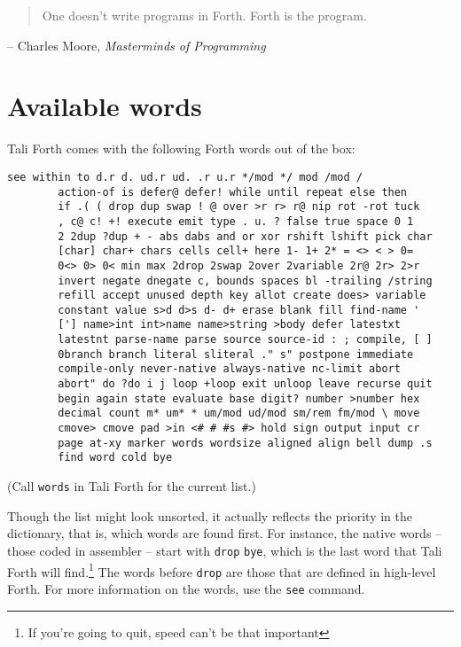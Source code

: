 
\begin{quote}
	One doesn't write programs in Forth. Forth is the program.
\end{quote}
\begin{flushright}
        -- Charles Moore, \textit{Masterminds of Programming}\cite{biancuzzi09}
\end{flushright}

\section{Available words}

Tali Forth comes with the following Forth words out of the
box:

\begin{lstlisting}[frame=lines]
        see within to d.r d. ud.r ud. .r u.r */mod */ mod /mod /
        action-of is defer@ defer! while until repeat else then
        if .( ( drop dup swap ! @ over >r r> r@ nip rot -rot tuck
        , c@ c! +! execute emit type . u. ? false true space 0 1
        2 2dup ?dup + - abs dabs and or xor rshift lshift pick char
        [char] char+ chars cells cell+ here 1- 1+ 2* = <> < > 0=
        0<> 0> 0< min max 2drop 2swap 2over 2variable 2r@ 2r> 2>r
        invert negate dnegate c, bounds spaces bl -trailing /string
        refill accept unused depth key allot create does> variable
        constant value s>d d>s d- d+ erase blank fill find-name '
        ['] name>int int>name name>string >body defer latestxt
        latestnt parse-name parse source source-id : ; compile, [ ]
        0branch branch literal sliteral ." s" postpone immediate
        compile-only never-native always-native nc-limit abort
        abort" do ?do i j loop +loop exit unloop leave recurse quit
        begin again state evaluate base digit? number >number hex
        decimal count m* um* * um/mod ud/mod sm/rem fm/mod \ move
        cmove> cmove pad >in <# # #s #> hold sign output input cr
        page at-xy marker words wordsize aligned align bell dump .s
        find word cold bye
\end{lstlisting}

(Call \texttt{words} in Tali Forth for the current
list.)

Though the list might look unsorted, it actually reflects the priority in the
dictionary, that is, which words are found first. For
instance, the native words -- those coded in assembler --
start with \texttt{drop}
\texttt{bye}, which is the last word that Tali Forth
will find.\footnote{If you're going to quit, speed can't be that important} The
words before \texttt{drop} are those that are defined in high-level Forth. For
more information on the words, use the \texttt{see}
command.

